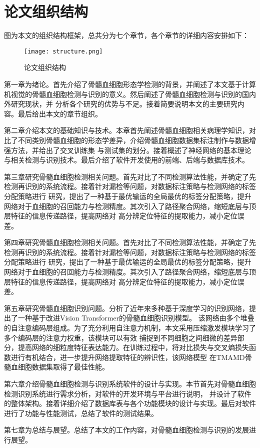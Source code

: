 \section{论文组织结构}
图为本文的组织结构框架，总共分为七个章节，各个章节的详细内容安排如下：

\begin{figure}
    \centering
    \texttt{[image: structure.png]}
    \caption{论文组织结构}
    \label{fig:structure}
  \end{figure}
  
第一章为绪论。首先介绍了骨髓血细胞形态学检测的背景，并阐述了本文基于计算机视觉的骨髓血细胞检测与识别的意义。然后阐述了骨髓血细胞检测与识别的国内外研究现状，并
分析各个研究的优势与不足。接着简要说明本文的主要研究内容。最后给出本文的章节组织。

第二章介绍本文的基础知识与技术。本章首先阐述骨髓血细胞相关病理学知识，对比了不同类别骨髓血细胞的形态学差异，介绍骨髓血细胞数据集标注制作与数据增强方法，并给出了交叉训练集
与测试集的划分。接着概述了神经网络的基本理论与相关检测与识别技术。最后介绍了软件开发使用的前端、后端与数据库技术。

第三章研究骨髓血细胞检测相关问题。首先对比了不同检测算法性能，并确定了先检测再识别的系统流程。接着针对漏检等问题，对数据标注策略与检测网络的标签分配策略进行
研究，提出了一种基于最优输运的全局最优的标签分配策略，提升网络对于血细胞的召回能力与检测精度。其次引入了路径聚合网络，缩短底层与顶层特征的信息传递路径，提高网络对
高分辨定位特征的提取能力，减小定位误差。

第四章研究骨髓血细胞检测相关问题。首先对比了不同检测算法性能，并确定了先检测再识别的系统流程。接着针对漏检等问题，对数据标注策略与检测网络的标签分配策略进行
研究，提出了一种基于最优输运的全局最优的标签分配策略，提升网络对于血细胞的召回能力与检测精度。其次引入了路径聚合网络，缩短底层与顶层特征的信息传递路径，提高网络对
高分辨定位特征的提取能力，减小定位误差。

第五章研究骨髓血细胞识别问题。分析了近年来多种基于深度学习的识别网络，提出了一种基于改进Vision Transformer的骨髓血细胞识别模型。
该网络由多个堆叠的自注意编码层组成。为了充分利用自注意力机制，本文采用压缩激发模块学习了多个编码层的注意力权重，该模块可以有效
捕捉到不同细胞之间细微的差异部分，提高网络的细粒度特征表达能力。在训练过程中，将对比损失与交叉熵损失函数进行有机结合，进一步提升网络提取特征的辨识性，该网络模型
在TMAMD骨髓血细胞数据集取得了最佳性能。

第六章介绍骨髓血细胞检测与识别系统软件的设计与实现。本节首先对骨髓血细胞检测识别系统进行需求分析，对软件的开发环境与平台进行说明，
并设计了软件的整体架构。接着详细介绍了数据库表与各个功能模块的设计与实现。最后对软件进行了功能与性能测试，总结了软件的测试结果。

第七章为总结与展望。总结了本文的工作内容，对骨髓血细胞检测与识别的发展进行展望。



